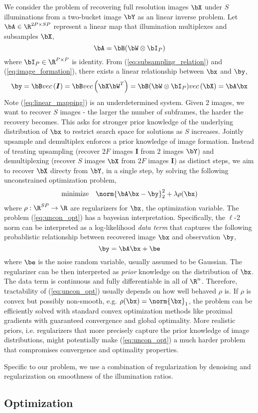 \documentclass[11pt]{article}
\renewcommand{\vec}[1]{vec\left(#1\right)}
\renewcommand{\sI}{\boldsymbol{I}}
\newcommand{\minimize}{\text{minimize}\quad}
\begin{document}
We consider the problem of recovering full resolution images $\bX$ under $S$ illuminations from a two-bucket image $\bY$ as an linear inverse problem. Let $\bA \in \R^{2P\times SP}$ represent a linear map that illumination multiplexes and subsamples $\bX$,
\[
    \bA = \bB(\bW\otimes \bI_P)
\]
where $\bI_P\in\R^{P\times P}$ is identity. From (\ref{eq:subsampling_relation}) and (\ref{eq:image_formation}), there exists a linear relationship between $\bx$ and $\by$,
\begin{equation}
    \label{eq:linear_mapping}
    \by = \bB \vec{\sI} = \bB \vec{\bX \bW^T} = \bB(\bW \otimes \bI_P) \vec{\bX} = \bA\bx
\end{equation}
Note (\ref{eq:linear_mapping}) is an underdetermined system. Given 2 images, we want to recover $S$ images - the larger the number of subframes, the harder the recovery becomes. This asks for stronger prior knowledge of the underlying distribution of $\bx$ to restrict search space for solutions as $S$ increases. Jointly upsample and demultiplex enforces a prior knowledge of image formation. Instead of treating upsampling (recover $2F$ images $\sI$ from $2$ images $\bY$) and demultiplexing (recover $S$ images $\bX$ from $2F$ images $\sI$) as distinct steps, we aim to recover $\bX$ directy from $\bY$, in a single step, by solving the following unconstrained optimization problem,
\begin{equation}
    \label{eq:uncon_opt}
    \begin{aligned}
        \minimize & \norm{\bA\bx - \by}_2^2 + \lambda\rho(\bx) \\
    \end{aligned}
\end{equation}
where $\rho:\R^{SP}\to\R$ are regularizers for $\bx$, the optimization variable. The problem (\ref{eq:uncon_opt}) has a bayesian interpretation. Specifically, the $\ell$-2 norm can be interpreted as a log-likelihood \textit{data term} that captures the following probablistic relationship between recovered image $\bx$ and observation $\by$, 
\[
    \by = \bA\bx + \be    
\]
where $\be$ is the noise random variable, usually assumed to be Gaussian. The regularizer can be then interpreted as \textit{prior} knowledge on the distribution of $\bx$. The data term is continuous and fully differentiable in all of $\R^n$. Therefore, tractability of (\ref{eq:uncon_opt}) usually depends on how well behaved $\rho$ is. If $\rho$ is convex but possibly non-smooth, e.g. $\rho(\bx)=\norm{\bx}_1$, the problem can be efficiently solved with standard convex optimization methods like proximal gradients with guaranteed convergence and global optimality.\cite{beckFastIterativeShrinkageThresholding2009} More realistic priors, i.e. regularizers that more precisely capture the prior knowledge of image distributions, might potentially make (\ref{eq:uncon_opt}) a much harder problem that compromises convergence and optimality properties.\cite{ulyanovDeepImagePrior2017}

$ $\\
Specific to our problem, we use a combination of regularization by denoising \cite{romanoLittleEngineThat2016} and regularization on smoothness of the illumination ratios.

\subsection{Optimization}

 

\newpage
\printbibliography
\end{document}
